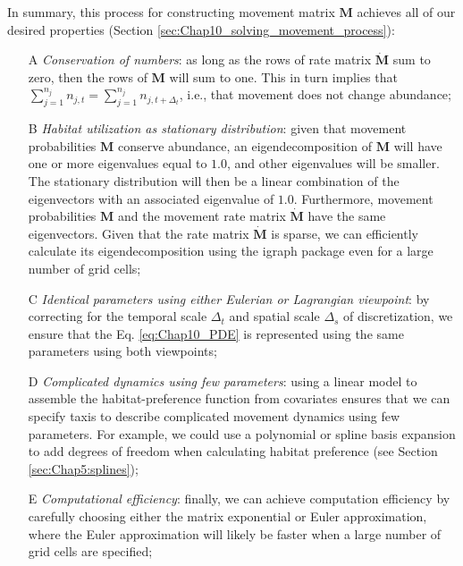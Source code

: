 In summary, this process for constructing movement matrix \(\mathbf{M}\) achieves all of our desired properties (Section \ref{sec:Chap10_solving_movement_process}):  
\begin{enumerate}
    \item[A] \textit{Conservation of numbers}: as long as the rows of rate matrix \(\dot{\mathbf{M}}\) sum to zero, then the rows of \(\mathbf{M}\) will sum to one.  This in turn implies that \( \sum_{j=1}^{n_j} n_{j,t} = \sum_{j=1}^{n_j} n_{j,t+\Delta_t} \), i.e., that movement does not change abundance; 

    \item[B] \textit{Habitat utilization as stationary distribution}:  given that movement probabilities \(\mathbf{M}\) conserve abundance, an eigendecomposition of \(\mathbf{M}\) will have one or more eigenvalues equal to \(1.0\), and other eigenvalues will be smaller.  The stationary distribution will then be a linear combination of the eigenvectors with an associated eigenvalue of \(1.0\).  Furthermore, movement probabilities \(\mathbf{M}\) and the movement rate matrix \(\dot{\mathbf{M}}\) have the same eigenvectors.  Given that the rate matrix \(\dot{\mathbf{M}}\) is sparse, we can efficiently calculate its eigendecomposition using the \colorbox{backcolour}{igraph} package \cite{csardi_igraph_2006} even for a large number of grid cells;

    \item[C] \textit{Identical parameters using either Eulerian or Lagrangian viewpoint}: by correcting for the temporal scale \(\Delta_t\) and spatial scale \(\Delta_s\) of discretization, we ensure that the Eq. \ref{eq:Chap10_PDE} is represented using the same parameters using both viewpoints;
    
    \item[D] \textit{Complicated dynamics using few parameters}:  using a linear model to assemble the habitat-preference function from covariates ensures that we can specify taxis to describe complicated movement dynamics using few parameters.  For example, we could use a polynomial or spline basis expansion to add degrees of freedom when calculating habitat preference (see Section \ref{sec:Chap5:splines});
    
    \item[E] \textit{Computational efficiency}:  finally, we can achieve computation efficiency by carefully choosing either the matrix exponential or Euler approximation, where the Euler approximation will likely be faster when a large number of grid cells are specified;


\end{enumerate}

